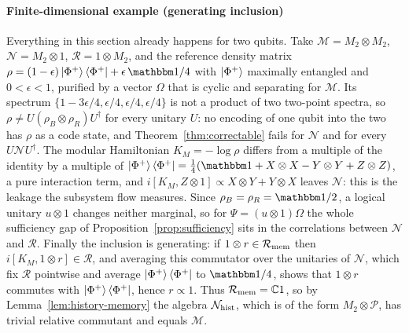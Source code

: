 \documentclass[a4paper,11pt]{article}
\theoremstyle{definition}
\begin{document}
\paragraph{Finite-dimensional example (generating inclusion)}
Everything in this section already happens for two qubits. Take $\mathcal M=M_2\otimes M_2$, $\mathcal N=M_2\otimes1$, $\mathcal R=1\otimes M_2$, and the reference density matrix $\rho=(1-\epsilon)\ket{\Phi^+}\bra{\Phi^+}+\epsilon\,\mathbbm 1/4$ with $\ket{\Phi^+}$ maximally entangled and $0<\epsilon<1$, purified by a vector $\Omega$ that is cyclic and separating for $\mathcal M$. Its spectrum $\{1-3\epsilon/4,\epsilon/4,\epsilon/4,\epsilon/4\}$ is not a product of two two-point spectra, so $\rho\ne U(\rho_B\otimes\rho_R)U^\dagger$ for every unitary $U$: no encoding of one qubit into the two has $\rho$ as a code state, and Theorem~\ref{thm:correctable} fails for $\mathcal N$ and for every $U\mathcal NU^\dagger$. The modular Hamiltonian $K_M=-\log\rho$ differs from a multiple of the identity by a multiple of $\ket{\Phi^+}\bra{\Phi^+}=\tfrac14(\mathbbm 1+X\otimes X-Y\otimes Y+Z\otimes Z)$, a pure interaction term, and $i[K_M,Z\otimes1]\propto X\otimes Y+Y\otimes X$ leaves $\mathcal N$: this is the leakage the subsystem flow measures. Since $\rho_B=\rho_R=\mathbbm 1/2$, a logical unitary $u\otimes1$ changes neither marginal, so for $\Psi=(u\otimes1)\Omega$ the whole sufficiency gap of Proposition~\ref{prop:sufficiency} sits in the correlations between $\mathcal N$ and $\mathcal R$. Finally the inclusion is generating: if $1\otimes r\in\mathcal R_{\rm mem}$ then $i[K_M,1\otimes r]\in\mathcal R$, and averaging this commutator over the unitaries of $\mathcal N$, which fix $\mathcal R$ pointwise and average $\ket{\Phi^+}\bra{\Phi^+}$ to $\mathbbm 1/4$, shows that $1\otimes r$ commutes with $\ket{\Phi^+}\bra{\Phi^+}$, hence $r\propto1$. Thus $\mathcal R_{\rm mem}=\mathbb C1$, so by Lemma~\ref{lem:history-memory} the algebra $\mathcal N_{\rm hist}$, which is of the form $M_2\otimes\mathcal P$, has trivial relative commutant and equals $\mathcal M$.
\end{document}
